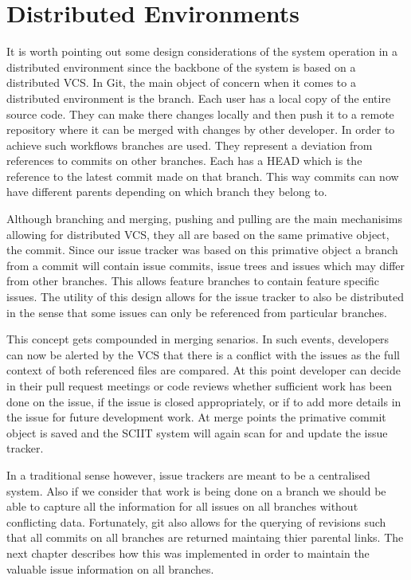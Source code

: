 \documentclass{mproj}
\begin{document}

\section{Distributed Environments}

It is worth pointing out some design considerations of the system operation in a distributed environment since the backbone of the system is based on a distributed VCS. In Git, the main object of concern when it comes to a distributed environment is the branch. Each user has a local copy of the entire source code. They can make there changes locally and then push it to a remote repository where it can be merged with changes by other developer. In order to achieve such workflows branches are used. They represent a deviation from references to commits on other branches. Each has a HEAD which is the reference to the latest commit made on that branch. This way commits can now have different parents depending on which branch they belong to.

Although branching and merging, pushing and pulling are the main mechanisims allowing for distributed VCS, they all are based on the same primative object, the commit. Since our issue tracker was based on this primative object a branch from a commit will contain issue commits, issue trees and issues which may differ from other branches. This allows feature branches to contain feature specific issues. The utility of this design allows for the issue tracker to also be distributed in the sense that some issues can only be referenced from particular branches.

This concept gets compounded in merging senarios. In such events, developers can now be alerted by the VCS that there is a conflict with the issues as the full context of both referenced files are compared. At this point developer can decide in their pull request meetings or code reviews whether sufficient work has been done on the issue, if the issue is closed appropriately, or if to add more details in the issue for future development work. At merge points the primative commit object is saved and the SCIIT system will again scan for and update the issue tracker.

In a traditional sense however, issue trackers are meant to be a centralised system. Also if we consider that work is being done on a branch we should be able to capture all the information for all issues on all branches without conflicting data. Fortunately, git also allows for the querying of revisions such that all commits on all branches are returned maintaing thier parental links. The next chapter describes how this was implemented in order to maintain the valuable issue information on all branches.
\end{document}
